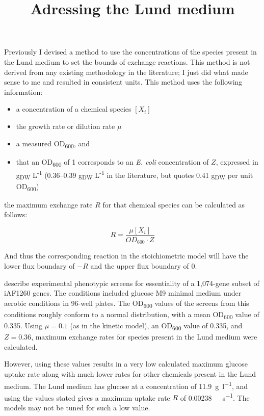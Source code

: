 \documentclass[a4paper]{scrartcl}
\title{Adressing the Lund medium}
\date{}
\begin{document}
\maketitle

Previously I devised a method to
use the concentrations of the species present in the Lund medium to set the bounds of exchange reactions.
This method is not derived from any existing methodology in the literature; I just did what made sense to me and resulted in consistent units.
This method uses the following information:

\begin{itemize}
\item a concentration of a chemical species $[X_{i}]$
\item the growth rate or dilution rate $\mu$
\item a measured OD\textsubscript{600}, and
\item that an OD\textsubscript{600} of 1 corresponds to an \emph{E. coli} concentration of $Z$, expressed in g\textsubscript{DW} L\textsuperscript{-1} (0.36--0.39 g\textsubscript{DW} L\textsuperscript{-1} in the literature, but \citet{nanchen_nonlinear_2006} quotes 0.41 g\textsubscript{DW} per unit OD\textsubscript{600})
\end{itemize}
  
the maximum exchange rate $R$ for that chemical species can be calculated as follows:

\[
  R = \frac{\mu[X_{i}]}{OD_{600} \cdot Z}
\]

And thus the corresponding reaction in the stoichiometric model will have the lower flux boundary of $-R$ and the upper flux boundary of 0.

\citet{orth_comprehensive_2011} describe experimental phenotypic screens for essentiality of a 1,074-gene subset of iAF1260 genes. The conditions included glucose M9 minimal medium under aerobic conditions in 96-well plates. The OD\textsubscript{600} values of the screens from this conditions roughly conform to a normal distribution, with a mean OD\textsubscript{600} value of 0.335.
Using $\mu = 0.1$ (as in the kinetic model), an OD\textsubscript{600} value of 0.335, and $Z = 0.36$, maximum exchange rates for species present in the Lund medium were calculated.

However, using these values results in a very low calculated maximum glucose uptake rate along with much lower rates for other chemicals present in the Lund medium.
The Lund medium has glucose at a concentration of \SI{11.9}{\gram\per\litre}, and using the values stated gives a maximum uptake rate $R$ of \SI{0.00238}{\milli\Molar\per\second}. The models may not be tuned for such a low value.
\end{document}

